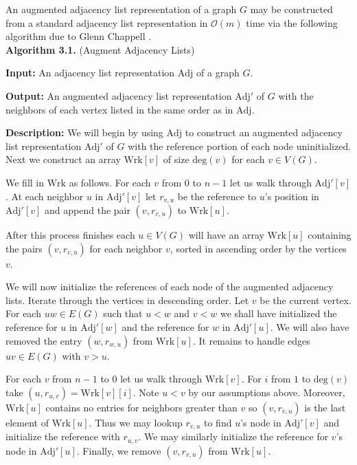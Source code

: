 \documentclass[letterpaper, 12pt]{article}
\theoremstyle{definition}
\theoremstyle{definition}
\theoremstyle{thm}
\theoremstyle{definition}
\begin{document}
An augmented adjacency list
representation of a graph $G$ may be constructed from a standard adjacency list
representation in $\mathcal{O}(m)$ time via the following algorithm due to 
Glenn Chappell \cite{chappell}.\\

\noindent\textbf{Algorithm 3.1.} (Augment Adjacency Lists)

\noindent\textbf{Input:} An adjacency list representation $\text{Adj}$ of a
graph $G$.

\noindent\textbf{Output:} An augmented adjacency list representation
$\text{Adj}'$ of $G$ with the neighbors of each vertex listed in the same order
as in $\text{Adj}$.

\noindent\textbf{Description:} We will begin by using $\text{Adj}$ to construct
an augmented adjacency list representation $\text{Adj}'$ of $G$ with the
reference portion of each node uninitialized.
Next we construct an array $\text{Wrk}[v]$ of size $\text{deg}(v)$ for each
$v\in V(G)$.

We fill in $\text{Wrk}$ as follows. For each $v$ from $0$ to $n-1$ let us walk
through $\text{Adj}'[v]$. At each neighbor $u$ in $\text{Adj}'[v]$ let
$r_{v,u}$ be the reference to $u$'s position in $\text{Adj}'[v]$ and append the
pair $(v,r_{v,u})$ to $\text{Wrk}[u]$.

After this process finishes each $u\in V(G)$ will have an array $\text{Wrk}[u]$
containing the pairs $(v,r_{v,u})$ for each neighbor $v$, sorted in ascending
order by the vertices $v$.

We will now initialize the references of each node of
the augmented adjacency lists.
Iterate through the vertices in descending order. Let $v$ be the current
vertex. For each 
$uw\in E(G)$ such that $u<w$ and $v<w$ we shall have initialized the reference
for $u$ in $\text{Adj}'[w]$ and the reference for $w$ in $\text{Adj}'[u]$. We
will also have removed the entry $(w,r_{w,u})$ from $\text{Wrk}[u]$. It remains
to handle edges $uv\in E(G)$ with $v>u$.

For each $v$ from $n-1$ to $0$ let us walk through $\text{Wrk}[v]$. For $i$ from
$1$ to $\text{deg}(v)$ take $(u,r_{u,v})=\text{Wrk}[v][i]$. Note $u<v$ by our
assumptions above. Moreover, $\text{Wrk}[u]$ contains no entries for neighbors
greater than $v$ so $(v,r_{v,u})$ is the last element of $\text{Wrk}[u]$. Thus
we may lookup $r_{v,u}$ to find $u$'s node in $\text{Adj}'[v]$ and initialize
the reference with $r_{u,v}$. We may similarly initialize the reference for
$v$'s node in $\text{Adj}'[u]$. Finally, we remove $(v,r_{v,u})$ from
$\text{Wrk}[u]$.
\end{document}
